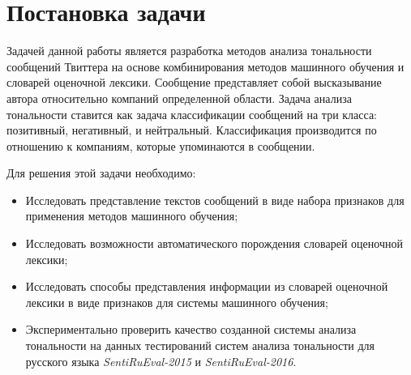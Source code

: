 \newpage
\section{Постановка задачи}
%
%
Задачей данной работы является разработка методов анализа тональности сообщений
Твиттера на основе комбинирования методов машинного обучения и словарей
оценочной лексики.
Сообщение представляет собой высказывание автора относительно компаний
определенной области.
Задача анализа тональности ставится как задача классификации сообщений на три
класса: позитивный, негативный, и нейтральный.
Классификация производится по отношению к компаниям, которые упоминаются в
сообщении.

%
%
Для решения этой задачи необходимо:
\begin{itemize}
    \item Исследовать представление текстов сообщений в виде набора признаков для
        применения методов машинного обучения;
    \item Исследовать возможности автоматического порождения словарей оценочной
        лексики;
    \item Исследовать способы представления информации из словарей оценочной
        лексики в виде признаков для системы машинного обучения;
    \item Экспериментально проверить качество созданной системы анализа
        тональности на данных тестирований систем анализа тональности для
        русского языка {\it SentiRuEval-2015} и {\it SentiRuEval-2016}.
\end{itemize}
